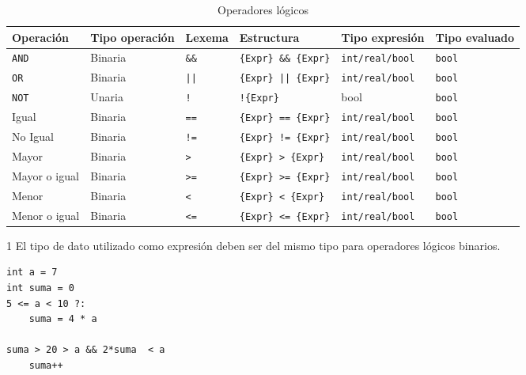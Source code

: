 \documentclass[11pt, english]{article}
\begin{document}
\begin{table}[H]
	\begin{center}
		\caption{Operadores lógicos}\label{tab:logic-operators}
		\begin{threeparttable}
			\begin{tabular}{l|lllll}
				\toprule
				\textbf{Operación} & \textbf{Tipo operación} & \textbf{Lexema} & \textbf{Estructura} & \textbf{Tipo expresión}\tnote{1} & \textbf{Tipo evaluado}\\
				\midrule
				\texttt{AND} & Binaria & \texttt{\&\&} & \texttt{\{Expr\} \&\& \{Expr\}} & \texttt{int/real/bool} & \texttt{bool}\\
				\texttt{OR} & Binaria & \texttt{||} & \texttt{\{Expr\} || \{Expr\}} & \texttt{int/real/bool} & \texttt{bool}\\
				\texttt{NOT} & Unaria & \texttt{!} & \texttt{!\{Expr\}} & bool & \texttt{bool}\\
				Igual & Binaria & \texttt{==} & \texttt{\{Expr\} == \{Expr\}} & \texttt{int/real/bool} & \texttt{bool}\\
				No Igual & Binaria & \texttt{!=} & \texttt{\{Expr\} != \{Expr\}} & \texttt{int/real/bool} & \texttt{bool}\\
				Mayor & Binaria & \texttt{>} & \texttt{\{Expr\} > \{Expr\}} & \texttt{int/real/bool} & \texttt{bool}\\
				Mayor o igual & Binaria & \texttt{>=} & \texttt{\{Expr\} >= \{Expr\}} & \texttt{int/real/bool} & \texttt{bool}\\
				Menor & Binaria & \texttt{<} & \texttt{\{Expr\} < \{Expr\}} & \texttt{int/real/bool} & \texttt{bool}\\
				Menor o igual & Binaria & \texttt{<=} & \texttt{\{Expr\} <= \{Expr\}} & \texttt{int/real/bool} & \texttt{bool}\\
				\bottomrule
			\end{tabular}
			\begin{tablenotes}
				\small
				\item[1] El tipo de dato utilizado como expresión deben ser del mismo tipo para operadores lógicos binarios.
			\end{tablenotes}
		\end{threeparttable}
	\end{center}
\end{table}

\begin{lstlisting}[caption=Ejemplo de uso los operadores lógicos]
int a = 7
int suma = 0
5 <= a < 10 ?:
	suma = 4 * a

suma > 20 > a && 2*suma  < a
	suma++
\end{lstlisting}
\end{document}
